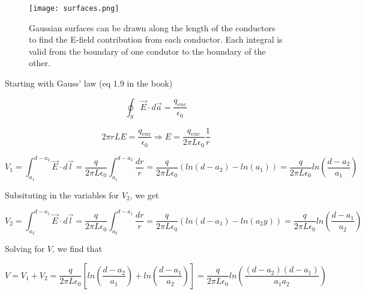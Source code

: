 \begin{figure}[h]
  \begin{center}

    \texttt{[image: surfaces.png]}

    \caption{Gaussian surfaces can be drawn along the length of the
      conductors to find the E-field contribution from each conductor.
      Each integral is valid from the boundary of one condutor to the
      boundary of the other.}

    \label{fig:1:7:gauss}

  \end{center}
\end{figure}


Starting with Gauss' law (eq 1.9 in the book)

\begin{equation}
  \oint_S \vec{E} \cdot d\vec{a} = \frac{q_{enc}}{\epsilon_0}
\end{equation}

\begin{equation}
  \label{eq:1:7:e}
  2 \pi r L E = \frac{q_{enc}}{\epsilon_0}
  \Rightarrow E = \frac{q_{enc}}{2 \pi L \epsilon_0} \frac 1 r
\end{equation}

\begin{equation}
  \label{eq:1:7:v1}
  V_1 = \int_{a_1}^{d-a_2}{\vec{E} \cdot d\vec{l}}
  = \frac{q}{2 \pi L \epsilon_0} \int_{a_1}^{d-a_2}{\frac{dr}{r}}
  = \frac{q}{2 \pi L \epsilon_0} \left( ln(d-a_2) - ln(a_1)\right)
  = \frac{q}{2 \pi L \epsilon_0} ln\left( \frac{d-a_2}{a_1} \right)
\end{equation}

Subsituting in the variables for $V_2$, we get

\begin{equation}
  \label{eq:1:7:v2}
  V_2 = \int_{a_2}^{d-a_1}{\vec{E} \cdot d\vec{l}}
  = \frac{q}{2 \pi L \epsilon_0} \int_{a_2}^{d-a_1}{\frac{dr}{r}}
  = \frac{q}{2 \pi L \epsilon_0} \left( ln(d-a_1) - ln(a_2y)\right)
  = \frac{q}{2 \pi L \epsilon_0} ln\left( \frac{d-a_1}{a_2} \right)
\end{equation}

Solving for $V$, we find that

\begin{equation}
  V = V_1 + V_2
  = \frac{q}{2 \pi L \epsilon_0} \left[ ln\left( \frac{d-a_2}{a_1} \right) + ln\left( \frac{d-a_1}{a_2} \right) \right]
  = \frac{q}{2 \pi L \epsilon_0} ln\left( \frac{(d-a_2)(d-a_1)}{a_1a_2} \right)
\end{equation}

